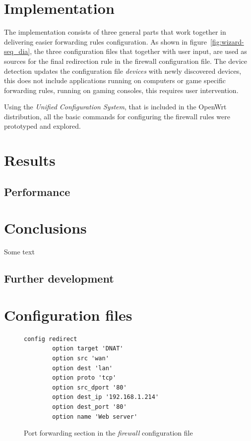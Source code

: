 \documentclass[a4paper,11pt]{kth-bcs}
\begin{document}
\chapter{Implementation}
The implementation consists of three general parts that work together in delivering easier forwarding rules configuration.
As shown in figure~\ref{fig:wizard-seq_dia}, the three configuration files that together with user input, are used as sources for the final redirection rule in the firewall configuration file.
The device detection updates the configuration file \emph{devices} with newly discovered devices, this does not include applications running on computers or game specific forwarding rules, running on gaming consoles, this requires user intervention.


Using the \emph{Unified Configuration System}, that is included in the OpenWrt distribution, all the basic commands for configuring the firewall rules were prototyped and explored.

\chapter{Results}
\section{Performance}

\chapter{Conclusions}
Some text



\section{Further development}

\newpage
\newpage
\appendix
\addappheadtotoc
\chapter{Configuration files}\label{appA}
   \begin{figure}[ht]
      \centering
      \begin{verbatim}
config redirect               
        option target 'DNAT' 
        option src 'wan'
        option dest 'lan'
        option proto 'tcp'
        option src_dport '80'
        option dest_ip '192.168.1.214'
        option dest_port '80' 
        option name 'Web server'
      \end{verbatim}
      \caption{
         \small{
Port forwarding section in the \emph{firewall} configuration file
         }
      }
      \label{fig:redirect_conf}
   \end{figure}
\end{document}
